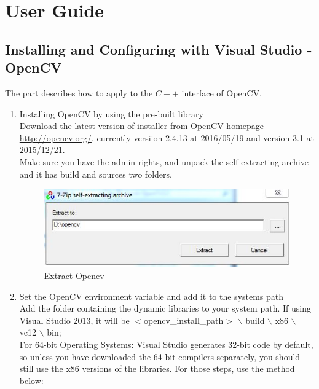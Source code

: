 \appendix
\chapter{User Guide}\label{appendix:code}
\section{Installing and Configuring with Visual Studio - OpenCV}
The part describes how to apply to the $C++$ interface of OpenCV.\\

\begin{enumerate}
\item{Installing OpenCV by using the pre-built library}\\

Download the latest version of installer from OpenCV homepage \url{http://opencv.org/}, currently versiion 2.4.13 at 2016/05/19 and version 3.1 at 2015/12/21.\\

Make sure you have the admin rights, and unpack the self-extracting archive and it has build and sources two folders.
\begin{figure}[!htb]
	\centering
	\includegraphics[scale=0.8]{img/user/unpack}
	\caption{Extract Opencv}
\end{figure}

\item{Set the OpenCV environment variable and add it to the systems path}\\

Add the folder containing the dynamic libraries to your system path. If using Visual Studio 2013, it will be 
$<$opencv\_install\_path$>$ $\backslash$ build $\backslash$ x86 $\backslash$ vc12 $\backslash$ bin;\\

For 64-bit Operating Systems: Visual Studio generates 32-bit code by default, so unless you have
downloaded the 64-bit compilers separately, you should still use the x86 versions of the libraries. For those steps, use the method below:\\


\end{enumerate}
